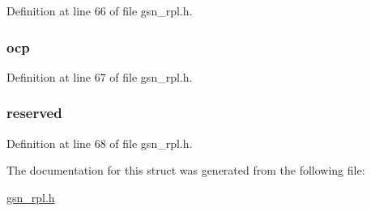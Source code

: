 Definition at line 66 of file gsn\_\-rpl.h.

\hypertarget{a00199_a49e423d539b6a3bee3c7241705fe3baa}{
\subsubsection[{ocp}]{ {\bf ocp}}}
\label{a00199_a49e423d539b6a3bee3c7241705fe3baa}


Definition at line 67 of file gsn\_\-rpl.h.

\hypertarget{a00199_a61b1cfce69fc0011cd7b07b127a3f3f6}{
\subsubsection[{reserved}]{ {\bf reserved}}}
\label{a00199_a61b1cfce69fc0011cd7b07b127a3f3f6}


Definition at line 68 of file gsn\_\-rpl.h.



The documentation for this struct was generated from the following file:\begin{DoxyCompactItemize}
\item 
\hyperlink{a00579}{gsn\_\-rpl.h}\end{DoxyCompactItemize}
